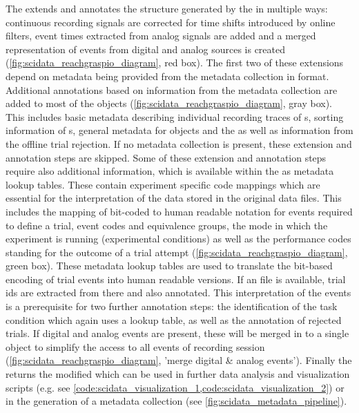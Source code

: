 The  extends and annotates the  structure generated by the  in multiple ways: continuous recording signals are corrected for time shifts introduced by online filters, event times extracted from analog signals are added and a merged representation of events from digital and analog sources is created (\cref{fig:scidata_reachgraspio_diagram}, red box). The first two of these extensions depend on metadata being provided from the metadata collection in  format. Additional annotations based on information from the metadata collection are added to most of the  objects (\cref{fig:scidata_reachgraspio_diagram}, gray box). This includes basic metadata describing individual recording traces of s, sorting information of s, general metadata for  objects and the  as well as information from the offline trial rejection. If no metadata collection is present, these extension and annotation steps are skipped. Some of these extension and annotation steps require also additional information, which is available within the  as metadata lookup tables. These contain experiment specific code mappings which are essential for the interpretation of the data stored in the original  data files. This includes the mapping of bit-coded to human readable notation for events required to define a trial, event codes and equivalence groups, the mode in which the experiment is running (experimental conditions) as well as the performance codes standing for the outcome of a trial attempt (\cref{fig:scidata_reachgraspio_diagram}, green box). These metadata lookup tables are used to translate the bit-based encoding of trial events into human readable versions. If an  file is available, trial ids are extracted from there and also annotated. This interpretation of the events is a prerequisite for two further annotation steps: the identification of the task condition which again uses a  lookup table, as well as the annotation of rejected trials. If digital and analog events are present, these will be merged in to a single  object to simplify the access to all events of recording session (\cref{fig:scidata_reachgraspio_diagram}, 'merge digital \& analog events'). Finally the  returns the modified  which can be used in further data analysis and visualization scripts (e.g. see \cref{code:scidata_visualization_1,code:scidata_visualization_2}) or in the generation of a metadata collection (see \cref{fig:scidata_metadata_pipeline}).

